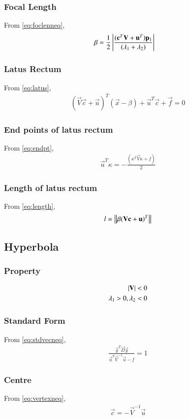\documentclass[journal,12pt,twocolumn]{IEEEtran}
\begin{document}
\subsubsection{Focal Length}
From \eqref{eq:foclenneq},
\begin{align}
    \beta &= \frac{1}{2}\left\vert\frac{(\mathbf{c}^T\mathbf{V}+\mathbf{u}^T)\mathbf{p}_1}{(\lambda_1+\lambda_2)}\right\vert 
\end{align}
\subsubsection{Latus Rectum}
From \eqref{eq:latus},
\begin{align}
    (\vec{V}\vec{c}+\vec{u})^T(\vec{x} -\beta) + \vec{u}^T\vec{c} + \vec{f} = 0
\end{align}
\subsubsection{End points of latus rectum}
From \eqref{eq:endpt},
\begin{align}
    \vec{u}^T\kappa = -\frac{(\kappa^T\vec{V}\kappa + f )}{2}
\end{align}
\subsubsection{Length of latus rectum}
From \eqref{eq:length},
\begin{align}
   l=\left\lVert\beta(\mathbf{V}\mathbf{c}+\mathbf{u})^T\right\rVert 
\end{align}


\subsection{Hyperbola}
\subsubsection{Property}
\begin{align}
    \left\vert\mathbf{V}\right\vert < 0
    \\
    \lambda_1>0,\lambda_2<0
\end{align}
\subsubsection{Standard Form}
From \eqref{eq:stdvecneq},
\begin{align}
    \frac{\vec{y}^T\vec{D}\vec{y}}{\vec{u}^T\vec{V}^{-1}\vec{u}-f}=1
\end{align}
\subsubsection{Centre}
From \eqref{eq:vertexneq},
\begin{align}
    \vec{c} = -\vec{V}^{-1}\vec{u}
\end{align}
\end{document}
